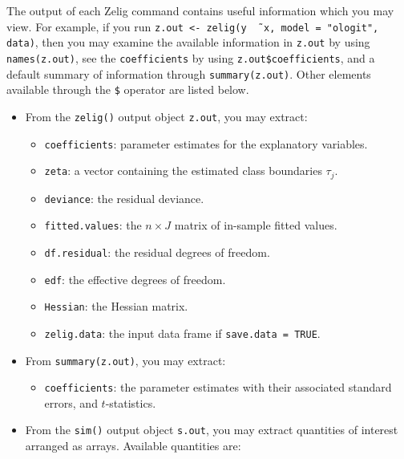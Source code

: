 \documentclass{article}
\begin{document}
The output of each Zelig command contains useful information which you
may view.  For example, if you run \texttt{z.out <- zelig(y \~\,
  x, model = "ologit", data)}, then you may examine the available
information in \texttt{z.out} by using \texttt{names(z.out)},
see the {\tt coefficients} by using {\tt z.out\$coefficients}, and
a default summary of information through \texttt{summary(z.out)}.
Other elements available through the {\tt \$} operator are listed
below.

\begin{itemize}
\item From the {\tt zelig()} output object {\tt z.out}, you may
  extract:
   \begin{itemize}
   \item {\tt coefficients}: parameter estimates for the explanatory
     variables.
   \item {\tt zeta}: a vector containing the estimated class
     boundaries $\tau_j$.
   \item {\tt deviance}: the residual deviance.
   \item {\tt fitted.values}: the $n \times J$ matrix of in-sample
     fitted values.
   \item {\tt df.residual}: the residual degrees of freedom.
   \item {\tt edf}: the effective degrees of freedom.  
   \item {\tt Hessian}: the Hessian matrix.
   \item {\tt zelig.data}: the input data frame if {\tt save.data = TRUE}.  
   \end{itemize}

\item From {\tt summary(z.out)}, you may extract: 
   \begin{itemize}
   \item {\tt coefficients}: the parameter estimates with their
     associated standard errors, and $t$-statistics.
   \end{itemize}
   
 \item From the {\tt sim()} output object {\tt s.out}, you may extract
   quantities of interest arranged as arrays.  Available quantities
   are:


\end{itemize}
\end{document}

